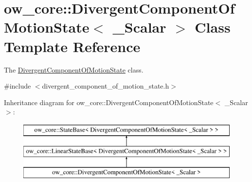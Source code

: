 \hypertarget{classow__core_1_1DivergentComponentOfMotionState}{}\section{ow\+\_\+core\+:\+:Divergent\+Component\+Of\+Motion\+State$<$ \+\_\+\+Scalar $>$ Class Template Reference}
\label{classow__core_1_1DivergentComponentOfMotionState}


The \hyperlink{classow__core_1_1DivergentComponentOfMotionState}{Divergent\+Component\+Of\+Motion\+State} class.  




{\ttfamily \#include $<$divergent\+\_\+component\+\_\+of\+\_\+motion\+\_\+state.\+h$>$}

Inheritance diagram for ow\+\_\+core\+:\+:Divergent\+Component\+Of\+Motion\+State$<$ \+\_\+\+Scalar $>$\+:\begin{figure}[H]
\begin{center}
\leavevmode
\includegraphics[height=3.000000cm]{d2/dcf/classow__core_1_1DivergentComponentOfMotionState}
\end{center}
\end{figure}
